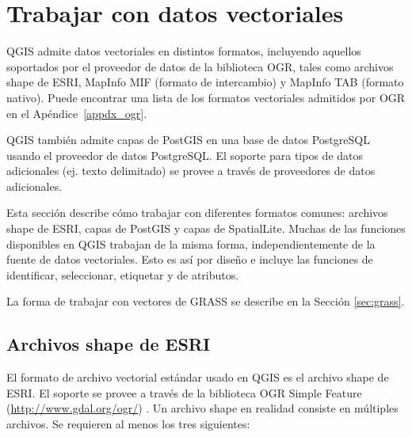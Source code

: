 
\section{Trabajar con datos vectoriales}\label{label_workingvector}



QGIS admite datos vectoriales en distintos formatos, incluyendo aquellos soportados por el proveedor de datos de la biblioteca OGR, tales como archivos shape de ESRI,
MapInfo MIF (formato de intercambio)
y MapInfo TAB (formato nativo).
Puede encontrar una lista de los formatos vectoriales admitidos por OGR en el Ap\'endice~\ref{appdx_ogr}.

QGIS también admite capas de PostGIS en una base de datos PostgreSQL usando el proveedor de datos PostgreSQL. El soporte para tipos de datos adicionales (ej. texto delimitado) se provee a trav\'es de proveedores de datos adicionales.

Esta secci\'on describe cómo trabajar con diferentes formatos comunes:
archivos shape de ESRI, capas de PostGIS y capas de SpatialLite. Muchas de las funciones disponibles en QGIS trabajan de la misma forma, independientemente de la fuente de datos vectoriales.
Esto es así por dise\~no e incluye las funciones de identificar, seleccionar, etiquetar y de atributos.

La forma de trabajar con vectores de GRASS se describe en la Secci\'on \ref{sec:grass}.

\subsection{Archivos shape de ESRI}

El formato de archivo vectorial estándar usado en QGIS es el archivo shape de ESRI. El soporte se provee a trav\'es de la biblioteca OGR Simple Feature (\url{http://www.gdal.org/ogr/})
. Un archivo shape en realidad consiste en m\'ultiples archivos. Se requieren al menos los tres siguientes:

